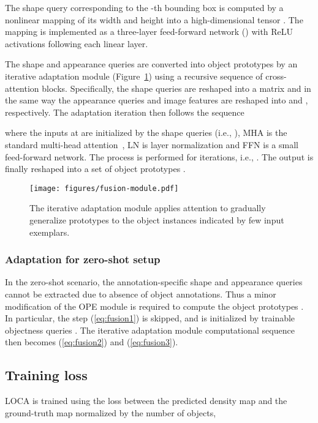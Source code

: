 \documentclass[10pt,twocolumn,letterpaper]{article}
\begin{document}
The shape query corresponding to the -th bounding box is computed by a nonlinear mapping  of its width  and height  into a high-dimensional tensor . The mapping  is implemented as a three-layer feed-forward network () with ReLU activations following each linear layer.

The shape and appearance queries are converted into object prototypes by an iterative adaptation module (Figure~\ref{fig:fusion}) using a recursive sequence of cross-attention blocks. 
Specifically, the shape queries  are reshaped into a matrix  and in the same way the appearance queries  and image features  are reshaped into  and , respectively. The adaptation iteration then follows the sequence

where the inputs at  are initialized by the shape queries (i.e., ), MHA is the standard multi-head attention~\cite{transformer}, LN is layer normalization and FFN is a small feed-forward network. The process is performed for  iterations, i.e., .
The output  is finally reshaped into a set of  object prototypes .

\begin{figure}[!t]
    \centering
    \texttt{[image: figures/fusion-module.pdf]}
    \caption{The iterative adaptation module applies attention to gradually generalize prototypes to the object instances indicated by few input exemplars.}
    \label{fig:fusion}
\end{figure}

\subsubsection{Adaptation for zero-shot setup}\label{sec:zeroshot}

In the zero-shot scenario, the annotation-specific shape and appearance queries cannot be extracted due to absence of object annotations. Thus a minor modification of the OPE module is required to compute the object prototypes . In particular, the step (\ref{eq:fusion1}) is skipped, and  is initialized by trainable objectness queries . The iterative adaptation module computational sequence then becomes (\ref{eq:fusion2}) and (\ref{eq:fusion3}).

\subsection{Training loss}  \label{sec:loss}

LOCA is trained using the  loss between the predicted density map  and the ground-truth map  normalized by the number of objects,
\end{document}
